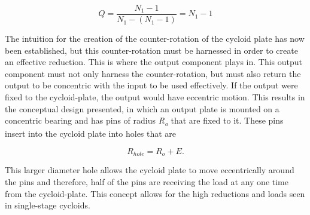 \begin{equation} \label{eq:single_stage_ratio}
Q = \frac{N_1-1} {N_1 - (N_1 - 1)} = N_1 -1
\end{equation}

The intuition for the creation of the counter-rotation of the cycloid plate has now been established, but this counter-rotation must be harnessed in order to create an effective reduction. This is where the output component plays in. This output component must not only harness the counter-rotation, but must also return the output to be concentric with the input to be used effectively. If the output were fixed to the cycloid-plate, the output would have eccentric motion. This results in the conceptual design presented, in which an output plate is mounted on a concentric bearing and has pins of radius \textit{R\textsubscript{o}} that are fixed to it. These pins insert into the cycloid plate into holes that are 

\begin{equation} \label{eq:pin_hole_diam}
R_{hole} = R_o + E.
\end{equation}

This larger diameter hole allows the cycloid plate to move eccentrically around the pins and therefore, half of the pins are receiving the load at any one time from the cycloid-plate. This concept allows for the high reductions and loads seen in single-stage cycloids.

